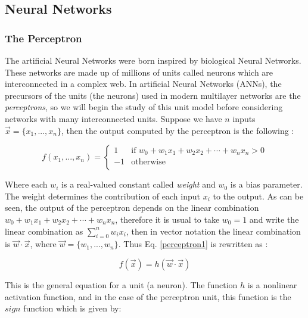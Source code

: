 \subsection{Neural Networks}
\subsubsection{The Perceptron}
\label{perceptron_section}
The artificial Neural Networks were born inspired by biological Neural Networks. These networks are made up of millions of units called neurons which are interconnected in a complex web. In artificial Neural Networks (ANNs), the precursors of the units (the neurons) used in modern multilayer networks are the \textit{perceptrons}, so we will begin the study of this unit model before considering networks with many interconnected units. Suppose we have $n$ inputs $\vec{x}= \{ x_{1},...,x_{n} \}$, then the output computed by the perceptron is the following \cite{machine_mitchell}:

\begin{equation}
\label{perceptron1}
	f(x_{1},...,x_{n})= \begin{cases}
	1 &\text{if $w_{0} +w _{1} x _{1} + w _{2} x _{2} + \cdots + w _{n} x _{n} > 0$}\\
	-1 &\text{otherwise }\\
	\end{cases}	
\end{equation}

Where each $w _{i}$ is a real-valued constant called \textit{weight} and $w _{0}$ is a bias parameter. The weight determines the contribution of each input $x _{i}$ to the output. As can be seen, the output of the perceptron depends on the linear combination $w_{0} +w _{1} x _{1} + w _{2} x _{2} + \cdots + w _{n} x _{n}$, therefore it is usual to take $w _{0}=1$ and write the linear combination as $\sum_{i=0}^{n} w _{i} x _{i} $, then in vector notation the linear combination is $\vec{w}\cdot \vec{x}$, where $\vec{w}= \{ w_{1},...,w_{n} \}$. Thus Eq. \ref{perceptron1} is rewritten as \cite{machine_mitchell}:

\begin{equation}
\label{unit_eq}
f(\vec{x})=h(\vec{w}\cdot \vec{x})
\end{equation}

This is the general equation for a unit (a neuron). The function $h$ is a nonlinear activation function, and in the case of the perceptron unit, this function is the $sign$ function which is given by:

